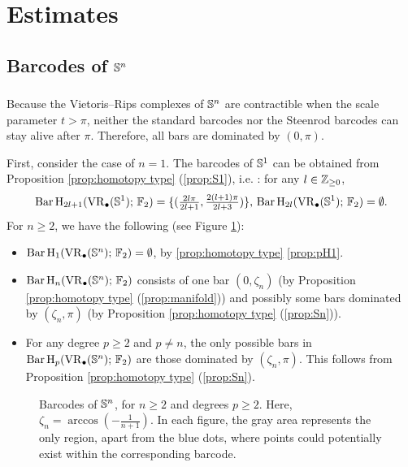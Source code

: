 
\section{Estimates}\label{s:computations}

\subsection{Barcodes of $\mathbb{S}^n$}\label{ss:Sn}

\subsubsection{}

Because the Vietoris--Rips complexes of $\mathbb{S}^n$ are contractible when the scale parameter $t>\pi$, neither the standard barcodes nor the Steenrod barcodes can stay alive after $\pi$.
Therefore, all bars are dominated by $(0,\pi)$.

First, consider the case of $n=1$.
The barcodes of $\mathbb{S}^1$ can be obtained from Proposition \ref{prop:homotopy type} (\ref{prop:S1}), i.e. \cite[Theorem~7.4]{adamaszek2017vietoris}: for any $l \in \mathbb{Z}_{\geq 0}$,
\begin{equation}\label{eq:barc of S1}
	\operatorname{Bar} \operatorname{H}_{2l+1}(\operatorname{VR}_\bullet(\mathbb{S}^1);\,{\mathbb{F}_2})=\{(\tfrac{2l\pi}{2l+1},\tfrac{2(l+1)\pi}{2l+3})\},\, \operatorname{Bar} \operatorname{H}_{2l}(\operatorname{VR}_\bullet(\mathbb{S}^1);\,{\mathbb{F}_2})=\emptyset.
\end{equation}
For $n\geq 2$, we have the following (see Figure \ref{fig:Sk}):
\begin{itemize}
	\item $\operatorname{Bar} \operatorname{H}_{1}(\operatorname{VR}_\bullet(\mathbb{S}^n);\,{\mathbb{F}_2}) = \emptyset$, by \cref{prop:homotopy type} \cref{prop:pH1}.
	\item $\operatorname{Bar} \operatorname{H}_{n}(\operatorname{VR}_\bullet(\mathbb{S}^n);\,{\mathbb{F}_2})$ consists of one bar $(0,\zeta_n)$ (by Proposition \ref{prop:homotopy type} (\ref{prop:manifold})) and possibly some bars dominated by $(\zeta_n,\pi)$ (by Proposition \ref{prop:homotopy type} (\ref{prop:Sn})).
	\item For any degree $p\geq 2$ and $p\neq n$, the only possible bars in $\operatorname{Bar} \operatorname{H}_{p}(\operatorname{VR}_\bullet(\mathbb{S}^n);\,{\mathbb{F}_2})$ are those dominated by $(\zeta_n,\pi)$.
	This follows from Proposition \ref{prop:homotopy type} (\ref{prop:Sn}).
\end{itemize}

\begin{figure}[ht]
	\centering
	
	\caption{Barcodes of $\mathbb{S}^n$, for $n\geq 2$ and degrees $p\geq 2$.
		Here, $\zeta_n=\arccos(-\frac{1}{n+1})$.
		In each figure, the gray area represents the only region, apart from the blue dots, where points could potentially exist within the corresponding barcode.}
	\label{fig:Sk}
\end{figure}

